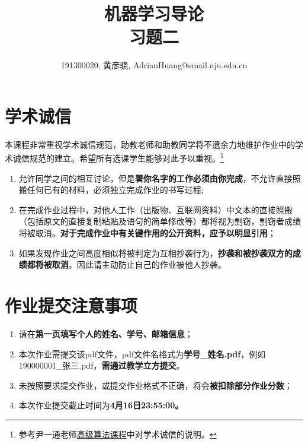 \documentclass[a4paper,UTF8]{article}
\theoremstyle{definition}
\begin{document}
\title{机器学习导论\\
	习题二}
\author{191300020, 黄彦骁, AdrianHuang@smail.nju.edu.cn}
\maketitle


\section*{学术诚信}

本课程非常重视学术诚信规范，助教老师和助教同学将不遗余力地维护作业中的学术诚信规范的建立。希望所有选课学生能够对此予以重视。\footnote{参考尹一通老师\href{http://tcs.nju.edu.cn/wiki/}{高级算法课程}中对学术诚信的说明。}

\begin{tcolorbox}
	\begin{enumerate}[(1)]
		\item 允许同学之间的相互讨论，但是{\color{red}\textbf{署你名字的工作必须由你完成}}，不允许直接照搬任何已有的材料，必须独立完成作业的书写过程;
		\item 在完成作业过程中，对他人工作（出版物、互联网资料）中文本的直接照搬（包括原文的直接复制粘贴及语句的简单修改等）都将视为剽窃，剽窃者成绩将被取消。{\color{red}\textbf{对于完成作业中有关键作用的公开资料，应予以明显引用}}；
		\item 如果发现作业之间高度相似将被判定为互相抄袭行为，{\color{red}\textbf{抄袭和被抄袭双方的成绩都将被取消}}。因此请主动防止自己的作业被他人抄袭。
	\end{enumerate}
\end{tcolorbox}

\section*{作业提交注意事项}
\begin{tcolorbox}
	\begin{enumerate}[(1)]
		\item 请在{\color{red}\textbf{第一页填写个人的姓名、学号、邮箱信息}}；
		\item 本次作业需提交该pdf文件，pdf文件名格式为{\color{red}\textbf{学号\_姓名.pdf}}，例如190000001\_张三.pdf，{\color{red}\textbf{需通过教学立方提交}}。
		\item 未按照要求提交作业，或提交作业格式不正确，将会{\color{red}\textbf{被扣除部分作业分数}}；
		\item 本次作业提交截止时间为{\color{red}\textbf{4月16日23:55:00。}}
	\end{enumerate}
\end{tcolorbox}
\end{document}

